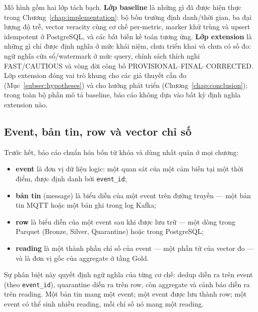 Mô hình gồm hai lớp tách bạch. \textbf{Lớp baseline} là những gì đã được
hiện thực trong Chương~\ref{chap:implementation}: bộ bốn trường
định danh/thời gian, ba đại lượng độ trễ, vector veracity cùng cơ chế
per-metric, marker khử trùng và upsert idempotent ở PostgreSQL, và các bất
biến kế toán tương ứng. \textbf{Lớp extension} là những gì chỉ được định
nghĩa ở mức khái niệm, chưa triển khai và chưa có số đo: ngữ nghĩa
cửa sổ/watermark ở mức query, chính sách thích nghi FAST/CAUTIOUS và vòng
đời công bố PROVISIONAL--FINAL--CORRECTED. Lớp extension đóng vai trò khung
cho các giả thuyết cần đo (Mục~\ref{subsec:hypotheses}) và cho hướng phát
triển (Chương~\ref{chap:conclusion}); trong toàn bộ phần mô tả baseline,
báo cáo không dựa vào bất kỳ định nghĩa extension nào.

\subsection{Event, bản tin, row và vector chỉ số}
\label{subsec:event-tuple}

Trước hết, báo cáo chuẩn hóa bốn từ khóa và dùng nhất quán ở mọi chương:

\begin{itemize}
  \item \textbf{event} là đơn vị dữ liệu logic: một quan sát của một cảm
        biến tại một thời điểm, được định danh bởi \texttt{event\_id};
  \item \textbf{bản tin} (message) là biểu diễn của một event trên đường
        truyền --- một bản tin MQTT hoặc một bản ghi trong log Kafka;
  \item \textbf{row} là biểu diễn của một event sau khi được lưu trữ ---
        một dòng trong Parquet (Bronze, Silver, Quarantine) hoặc trong
        PostgreSQL;
  \item \textbf{reading} là một thành phần chỉ số của event --- một phần
        tử của vector đo --- và là đơn vị gốc của aggregate ở tầng Gold.
\end{itemize}

Sự phân biệt này quyết định ngữ nghĩa của từng cơ chế: dedup diễn ra trên
event (theo \texttt{event\_id}), quarantine diễn ra trên row, còn aggregate
và cảnh báo diễn ra trên reading. Một bản tin mang một event; một event được
lưu thành row; một event có thể sinh nhiều reading, mỗi chỉ số nó mang một
reading.

